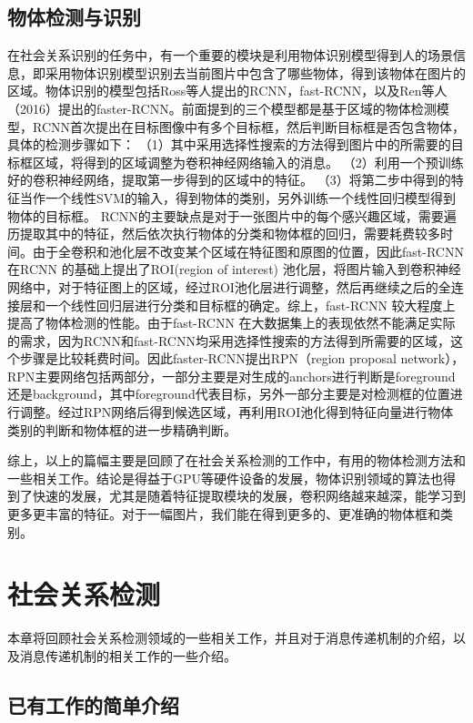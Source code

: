 \subsection{物体检测与识别}

在社会关系识别的任务中，有一个重要的模块是利用物体识别模型得到人的场景信息，即采用物体识别模型识别去当前图片中包含了哪些物体，得到该物体在图片的区域。物体识别的模型包括Ross等人提出的RCNN\cite{girshick2014rich}，fast-RCNN\cite{girshick2015fast}，以及Ren等人（2016）\cite{ren2015faster}提出的faster-RCNN。前面提到的三个模型都是基于区域的物体检测模型，RCNN\cite{girshick2014rich}首次提出在目标图像中有多个目标框，然后判断目标框是否包含物体，具体的检测步骤如下：
（1）其中采用选择性搜索的方法得到图片中的所需要的目标框区域，将得到的区域调整为卷积神经网络输入的消息。
（2）利用一个预训练好的卷积神经网络，提取第一步得到的区域中的特征。
（3）将第二步中得到的特征当作一个线性SVM的输入，得到物体的类别，另外训练一个线性回归模型得到物体的目标框。
RCNN的主要缺点是对于一张图片中的每个感兴趣区域，需要遍历提取其中的特征，然后依次执行物体的分类和物体框的回归，需要耗费较多时间。由于全卷积和池化层不改变某个区域在特征图和原图的位置，因此fast-RCNN 在RCNN 的基础上提出了ROI(region of interest) 池化层，将图片输入到卷积神经网络中，对于特征图上的区域，经过ROI池化层进行调整，然后再继续之后的全连接层和一个线性回归层进行分类和目标框的确定。综上，fast-RCNN 较大程度上提高了物体检测的性能。由于fast-RCNN 在大数据集上的表现依然不能满足实际的需求，因为RCNN和fast-RCNN均采用选择性搜索的方法得到所需要的区域，这个步骤是比较耗费时间。因此faster-RCNN提出RPN（region proposal network），RPN主要网络包括两部分，一部分主要是对生成的anchors进行判断是foreground还是background，其中foreground代表目标，另外一部分主要是对检测框的位置进行调整。经过RPN网络后得到候选区域，再利用ROI池化得到特征向量进行物体类别的判断和物体框的进一步精确判断。

综上，以上的篇幅主要是回顾了在社会关系检测的工作中，有用的物体检测方法和一些相关工作。结论是得益于GPU等硬件设备的发展，物体识别领域的算法也得到了快速的发展，尤其是随着特征提取模块的发展，卷积网络越来越深，能学习到更多更丰富的特征。对于一幅图片，我们能在得到更多的、更准确的物体框和类别。

\section{社会关系检测}
本章将回顾社会关系检测领域的一些相关工作，并且对于消息传递机制的介绍，以及消息传递机制的相关工作的一些介绍。

\subsection{已有工作的简单介绍}

